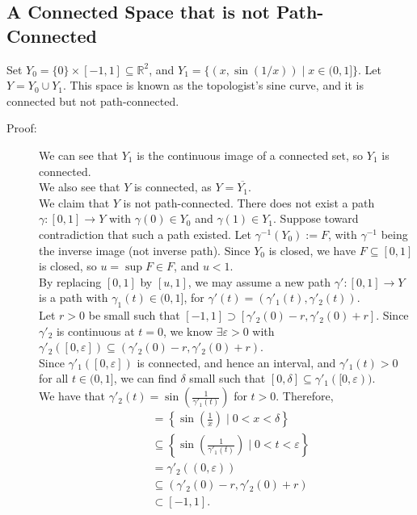 \documentclass[10pt]{extarticle}
\newcommand{\R}{\mathbb{R}}
\begin{document}
  \subsection{A Connected Space that is not Path-Connected}%
  Set $Y_0 = \{0\}\times [-1,1]\subseteq \R^2$, and $Y_1 = \{(x,\sin(1/x))\mid x\in (0,1]\}$. Let $Y = Y_0 \cup Y_1$. This space is known as the topologist's sine curve, and it is connected but not path-connected.
  \begin{description}
    \item[Proof:] We can see that $Y_1$ is the continuous image of a connected set, so $Y_1$ is connected.\\

      We also see that $Y$ is connected, as $Y = \overline{Y_1}$.\\

      We claim that $Y$ is not path-connected. There does not exist a path $\gamma: [0,1]\rightarrow Y$ with $\gamma(0)\in Y_0$ and $\gamma(1)\in Y_1$. Suppose toward contradiction that such a path existed. Let $\gamma^{-1}(Y_0) := F$, with $\gamma^{-1}$ being the inverse image (not inverse path). Since $Y_0$ is closed, we have $F\subseteq [0,1]$ is closed, so $u = \sup F \in F$, and $u < 1$.\\

      By replacing $[0,1]$ by $[u,1]$, we may assume a new path $\gamma': [0,1]\rightarrow Y$ is a path with $\gamma_1(t) \in (0,1]$, for $\gamma'(t) = (\gamma'_1(t),\gamma'_2(t))$.\\

      Let $r>0$ be small such that $[-1,1] \supset [\gamma'_2(0)-r,\gamma'_2(0)+r]$. Since $\gamma'_2$ is continuous at $t=0$, we know $\exists \varepsilon > 0$ with $\gamma'_2([0,\varepsilon])\subseteq (\gamma'_2(0)-r,\gamma'_2(0) + r)$.\\

      Since $\gamma'_1([0,\varepsilon])$ is connected, and hence an interval, and $\gamma'_1(t) > 0$ for all $t\in (0,1]$, we can find $\delta$ small such that $[0,\delta]\subseteq \gamma'_1([0,\varepsilon))$.\\

      We have that $\gamma'_2(t) = \sin \left(\frac{1}{\gamma'_1(t)}\right)$ for $t > 0$. Therefore,
      \begin{align*}
        [-1,1] &= \left\{\sin\left(\frac{1}{x}\right) \mid 0 < x < \delta\right\}\\
               &\subseteq \left\{\sin \left(\frac{1}{\gamma'_1(t)}\right)\mid 0 < t < \varepsilon\right\}\\
               &= \gamma'_2((0,\varepsilon))\\
               &\subseteq (\gamma'_2(0)-r,\gamma'_2(0)+r)\\
               &\subset [-1,1].
      \end{align*}
  \end{description}
\end{document}

